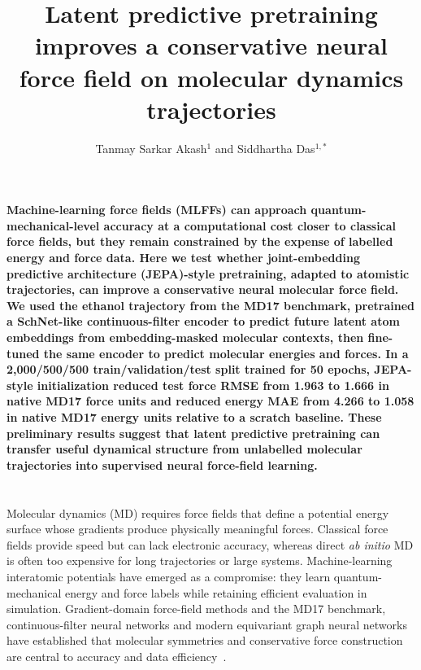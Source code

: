 \documentclass[11pt]{article}
\title{\textbf{Latent predictive pretraining improves a conservative neural force field on molecular dynamics trajectories}}
\author{Tanmay Sarkar Akash$^{1}$ and Siddhartha Das$^{1,*}$}
\affil{$^{1}$Department of Mechanical Engineering, University of Maryland, College Park, MD 20742\\
$^{*}$Email: \texttt{sidd@umd.edu}}
\date{}
\begin{document}
\maketitle

\noindent\textbf{Machine-learning force fields (MLFFs) can approach quantum-mechanical-level accuracy at a computational cost closer to classical force fields, but they remain constrained by the expense of labelled energy and force data. Here we test whether joint-embedding predictive architecture (JEPA)-style pretraining, adapted to atomistic trajectories, can improve a conservative neural molecular force field. We used the ethanol trajectory from the MD17 benchmark, pretrained a SchNet-like continuous-filter encoder to predict future latent atom embeddings from embedding-masked molecular contexts, then fine-tuned the same encoder to predict molecular energies and forces. In a 2,000/500/500 train/validation/test split trained for 50 epochs, JEPA-style initialization reduced test force RMSE from 1.963 to 1.666 in native MD17 force units and reduced energy MAE from 4.266 to 1.058 in native MD17 energy units relative to a scratch baseline. These preliminary results suggest that latent predictive pretraining can transfer useful dynamical structure from unlabelled molecular trajectories into supervised neural force-field learning.}

\section*{}

Molecular dynamics (MD) requires force fields that define a potential energy surface whose gradients produce physically meaningful forces. Classical force fields provide speed but can lack electronic accuracy, whereas direct \textit{ab initio} MD is often too expensive for long trajectories or large systems. Machine-learning interatomic potentials have emerged as a compromise: they learn quantum-mechanical energy and force labels while retaining efficient evaluation in simulation. Gradient-domain force-field methods and the MD17 benchmark, continuous-filter neural networks and modern equivariant graph neural networks have established that molecular symmetries and conservative force construction are central to accuracy and data efficiency~\cite{chmiela2017gdml, chmiela2018exact, schutt2017schnet, batzner2022nequip, batatia2022mace, musaelian2023allegro}.
\end{document}
